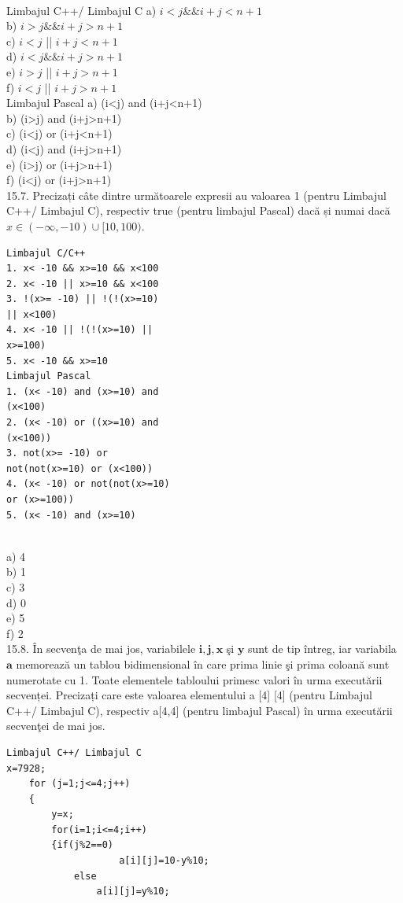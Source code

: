 {{\\
Limbajul C++/ Limbajul C
a) $i<j \& \& i+j<n+1$
\\
b) $i>j \& \& i+j>n+1$
\\
c) $i<j$ || $i+j<n+1$
\\
d) $i<j \& \& i+j>n+1$
\\
e) $i>j$ || $i+j>n+1$
\\
f) $i<j$ || $i+j>n+1$
\\
Limbajul Pascal
a) (i<j) and (i+j<n+1)
\\
b) (i>j) and (i+j>n+1)
\\
c) (i<j) or (i+j<n+1)
\\
d) (i<j) and (i+j>n+1)
\\
e) (i>j) or (i+j>n+1)
\\
f) (i<j) or (i+j>n+1)
\\
15.7. Precizați câte dintre următoarele expresii au valoarea 1 (pentru Limbajul C++/ Limbajul C), respectiv true (pentru limbajul Pascal) dacă și numai dacă $x \in(-\infty,-10) \cup[10,100)$.
\begin{verbatim}
Limbajul C/C++ 
1. x< -10 && x>=10 && x<100 
2. x< -10 || x>=10 && x<100 
3. !(x>= -10) || !(!(x>=10) 
|| x<100)
4. x< -10 || !(!(x>=10) || 
x>=100) 
5. x< -10 && x>=10
Limbajul Pascal 
1. (x< -10) and (x>=10) and 
(x<100) 
2. (x< -10) or ((x>=10) and 
(x<100)) 
3. not(x>= -10) or 
not(not(x>=10) or (x<100)) 
4. (x< -10) or not(not(x>=10) 
or (x>=100)) 
5. (x< -10) and (x>=10)
\end{verbatim}
\\
a) 4
\\
b) 1
\\
c) 3
\\
d) 0
\\
e) 5
\\
f) 2
\\
15.8. În secvenţa de mai jos, variabilele $\mathbf{i}, \mathbf{j}, \mathbf{x}$ şi $\mathbf{y}$ sunt de tip întreg, iar variabila $\mathbf{a}$ memorează un tablou bidimensional în care prima linie şi prima coloană sunt numerotate cu 1. Toate elementele tabloului primesc valori în urma executării secvenței. Precizați care este valoarea elementului a [4] [4] (pentru Limbajul C++/ Limbajul C), respectiv a[4,4] (pentru limbajul Pascal) în urma executării secvenţei de mai jos.
\begin{verbatim}
Limbajul C++/ Limbajul C
x=7928;
    for (j=1;j<=4;j++)
    {
        y=x;
        for(i=1;i<=4;i++)
        {if(j%2==0)
                    a[i][j]=10-y%10;
            else
                a[i][j]=y%10;

\end{verbatim}}}
